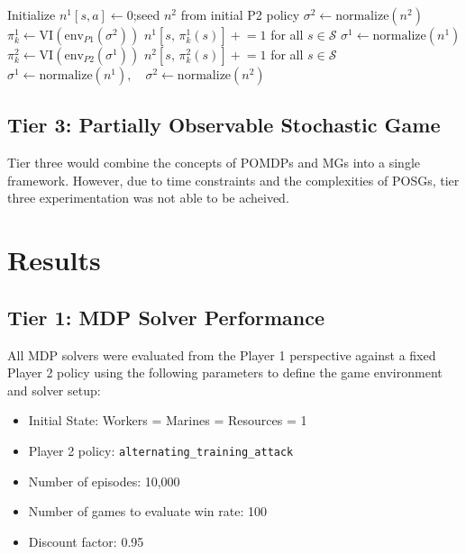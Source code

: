 \documentclass[conference]{IEEEtran}
\begin{document}
\begin{algorithm}
\caption{Fictitious Self-Play \cite{kochenderfer2022algorithms}}
\label{alg:fsp}
\begin{algorithmic}[1]
\State Initialize $n^1[s, a] \gets 0$;\quad seed $n^2$ from initial P2 policy
  \State $\sigma^2 \gets \mathrm{normalize}(n^2)$
  \State $\pi^1_k \gets \mathrm{VI}\!\left(\mathrm{env}_{P1}(\sigma^2)\right)$
  \State $n^1[s,\, \pi^1_k(s)] \mathrel{+}= 1$ for all $s \in \mathcal{S}$
  \State $\sigma^1 \gets \mathrm{normalize}(n^1)$
  \State $\pi^2_k \gets \mathrm{VI}\!\left(\mathrm{env}_{P2}(\sigma^1)\right)$
  \State $n^2[s,\, \pi^2_k(s)] \mathrel{+}= 1$ for all $s \in \mathcal{S}$
\EndFor
\State \Return $\sigma^1 \gets \mathrm{normalize}(n^1),\quad
               \sigma^2 \gets \mathrm{normalize}(n^2)$
\end{algorithmic}
\end{algorithm}

\subsection{Tier 3: Partially Observable Stochastic Game}

Tier three would combine the concepts of POMDPs and MGs into a single framework. However, due to time constraints and the complexities of POSGs, tier three experimentation was not able to be acheived. 

\section{Results}\label{sec:results}

\subsection{Tier 1: MDP Solver Performance}

All MDP solvers were evaluated from the Player 1 perspective against a fixed Player 2
policy using the following parameters to define the game environment and solver setup:
\begin{itemize}
  \item Initial State: Workers = Marines = Resources = 1
  \item Player 2 policy: \texttt{alternating\_training\_attack}
  \item Number of episodes: 10,000
  \item Number of games to evaluate win rate: 100
  \item Discount factor: 0.95
\end{itemize}
\end{document}
